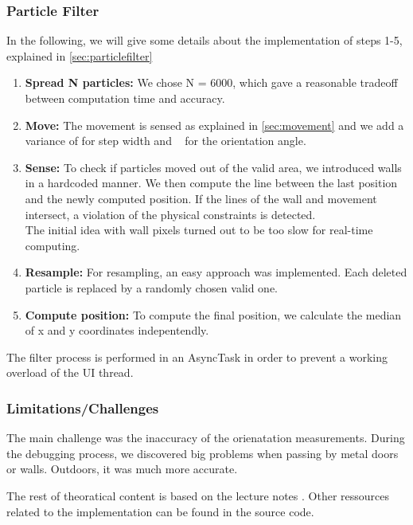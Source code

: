 \documentclass[12pt]{article}
\begin{document}
\subsubsection*{Particle Filter}
In the following, we will give some details about the implementation of steps 1-5, explained in \ref{sec:particlefilter}
\begin{enumerate}
	\item \textbf{Spread N particles:} We chose N = 6000, which gave a reasonable tradeoff between computation time and accuracy. 
	\item \textbf{Move:} The movement is sensed as explained in \ref{sec:movement} and we add a variance of \textpm 20cm for step width and \textdegree~ for the orientation angle.
	\item \textbf{Sense:} To check if particles moved out of the valid area, we introduced walls in a hardcoded manner. We then compute the line between the last position and the newly computed position. If the lines of the wall and movement intersect, a violation of the physical constraints is detected.\\
	The initial idea with wall pixels turned out to be too slow for real-time computing.
	\item \textbf{Resample:} For resampling, an easy approach was implemented. Each deleted particle is replaced by a randomly chosen valid one.
	\item \textbf{Compute position:} To compute the final position, we calculate the median of x and y coordinates indepentendly. 
\end{enumerate}

The filter process is performed in an AsyncTask in order to prevent a working overload of the UI thread.

\subsubsection{Limitations/Challenges}
The main challenge was the inaccuracy of the orienatation measurements. During the debugging process, we discovered big problems when passing by metal doors or walls. Outdoors, it was much more accurate.





The rest of theoratical content is based on the lecture notes \cite{lecturenotes}. Other ressources related to the implementation can be found in the source code.
\end{document}
